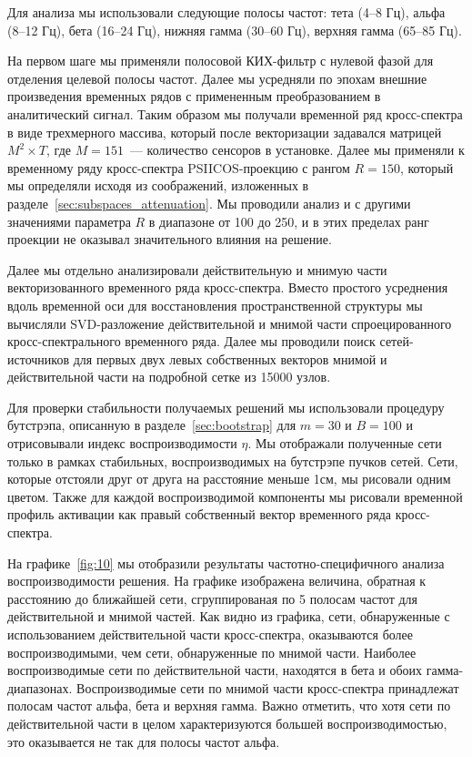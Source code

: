 Для анализа мы использовали следующие полосы частот: тета (4--8 Гц), альфа
(8--12 Гц), бета (16--24 Гц), нижняя гамма (30--60 Гц), верхняя гамма (65--85
Гц).

На первом шаге мы применяли полосовой КИХ-фильтр с нулевой фазой для отделения
целевой полосы частот. Далее мы усредняли по эпохам внешние произведения
временных рядов с примененным преобразованием в аналитический сигнал. Таким
образом мы получали временной ряд кросс-спектра в виде трехмерного массива,
который после векторизации задавался матрицей $M^2 \times T$, где $M=151$~---
количество сенсоров в установке. Далее мы применяли к временному ряду
кросс-спектра PSIICOS-проекцию с рангом $R=150$, который мы определяли исходя
из соображений, изложенных в разделе~\ref{sec:subspaces_attenuation}. Мы
проводили анализ и с другими значениями параметра $R$ в диапазоне от 100 до
250, и в этих пределах ранг проекции не оказывал значительного влияния на
решение.

Далее мы отдельно анализировали действительную и мнимую части векторизованного
временного ряда кросс-спектра. Вместо простого усреднения вдоль временной оси
для восстановления пространственной структуры мы вычисляли SVD-разложение
действительной и мнимой части спроецированного кросс-спектрального временного
ряда. Далее мы проводили поиск сетей-источников для первых двух левых
собственных векторов мнимой и действительной части на подробной сетке из 15000
узлов.

Для проверки стабильности получаемых решений мы использовали процедуру
бутстрэпа, описанную в разделе~\ref{sec:bootstrap} для $m=30$ и $B=100$ и
отрисовывали индекс воспроизводимости $\eta$.  Мы отображали полученные сети
только в рамках стабильных, воспроизводимых на бутстрэпе пучков сетей. Сети,
которые отстояли друг от друга на расстояние меньше 1см, мы рисовали одним
цветом.  Также для каждой воспроизводимой компоненты мы рисовали временной
профиль активации как правый собственный вектор временного ряда кросс-спектра.




На графике~\ref{fig:10} мы отобразили результаты частотно-специфичного
анализа воспроизводимости решения. На графике изображена величина, обратная к
расстоянию до ближайшей сети, сгруппированая по 5 полосам частот для
действительной и мнимой частей. Как видно из графика, сети, обнаруженные с
использованием действительной части кросс-спектра, оказываются более
воспроизводимыми, чем сети, обнаруженные по мнимой части. Наиболее воспроизводимые
сети по действительной части, находятся в бета и обоих гамма-диапазонах.
Воспроизводимые сети по мнимой части кросс-спектра принадлежат полосам частот
альфа, бета и верхняя гамма. Важно отметить, что хотя сети по действительной части
в целом характеризуются большей воспроизводимостью, это оказывается не так для
полосы частот альфа.

